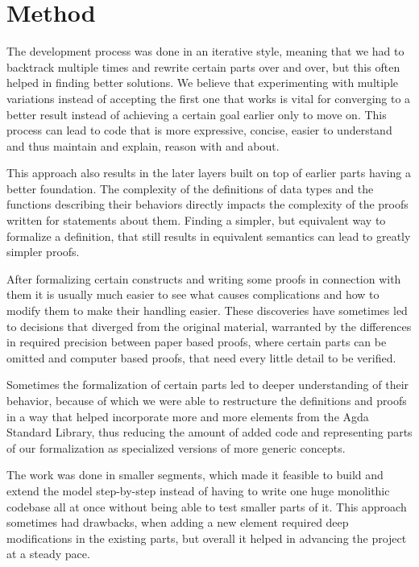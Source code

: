 \chapter{Method}
\label{chp:method}

The development process was done in an iterative style, meaning that we had to backtrack multiple times and rewrite certain parts over and over, but this often helped in finding better solutions. We believe that experimenting with multiple variations instead of accepting the first one that works is vital for converging to a better result instead of achieving a certain goal earlier only to move on. This process can lead to code that is more expressive, concise, easier to understand and thus maintain and explain, reason with and about.

This approach also results in the later layers built on top of earlier parts having a better foundation. The complexity of the definitions of data types and the functions describing their behaviors directly impacts the complexity of the proofs written for statements about them. Finding a simpler, but equivalent way to formalize a definition, that still results in equivalent semantics can lead to greatly simpler proofs.

After formalizing certain constructs and writing some proofs in connection with them it is usually much easier to see what causes complications and how to modify them to make their handling easier. These discoveries have sometimes led to decisions that diverged from the original material, warranted by the differences in required precision between paper based proofs, where certain parts can be omitted and computer based proofs, that need every little detail to be verified.

Sometimes the formalization of certain parts led to deeper understanding of their behavior, because of which we were able to restructure the definitions and proofs in a way that helped incorporate more and more elements from the Agda Standard Library\cite{agda-stdlib}, thus reducing the amount of added code and representing parts of our formalization as specialized versions of more generic concepts.

The work was done in smaller segments, which made it feasible to build and extend the model step-by-step instead of having to write one huge monolithic codebase all at once without being able to test smaller parts of it. This approach sometimes had drawbacks, when adding a new element required deep modifications in the existing parts, but overall it helped in advancing the project at a steady pace.

